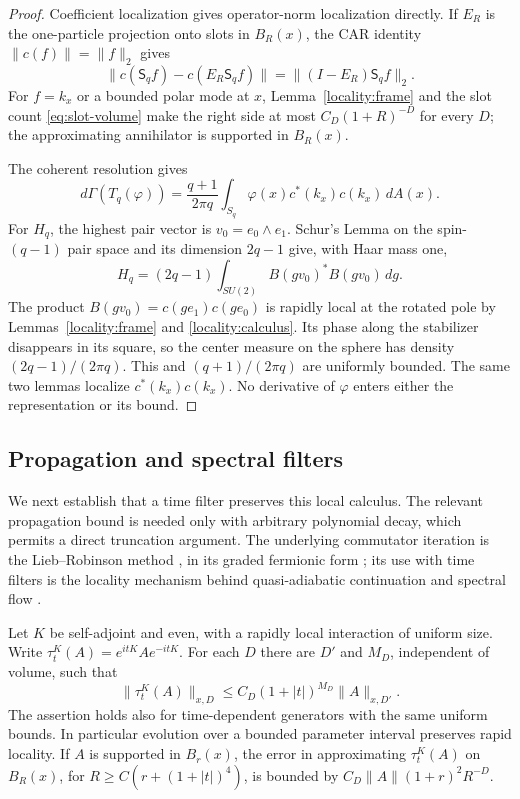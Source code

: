 \begin{proof}
Coefficient localization gives operator-norm localization directly.
If $E_R$ is the one-particle projection onto slots in $B_R(x)$, the
CAR identity $\|c(f)\|=\|f\|_2$ gives
\[
 \|c(\mathsf S_q f)-c(E_R\mathsf S_q f)\|
       =\|(I-E_R)\mathsf S_q f\|_2.
\]
For $f=k_x$ or a bounded polar mode at $x$,
Lemma~\ref{locality:frame} and the slot count
\eqref{eq:slot-volume} make the right side at most
$C_D(1+R)^{-D}$ for every $D$; the approximating annihilator is
supported in $B_R(x)$.

The coherent resolution gives
\[
 d\Gamma(T_q(\varphi))=\frac{q+1}{2\pi q}
       \int_{S_q}\varphi(x)c^*(k_x)c(k_x)\,dA(x).
\]
For $H_q$, the highest pair vector is $v_0=e_0\wedge e_1$.
Schur's Lemma on the spin-$(q-1)$ pair space and its dimension
$2q-1$ give, with Haar mass one,
\begin{equation}
 H_q=(2q-1)\int_{SU(2)}B(gv_0)^*B(gv_0)\,dg.
 \label{eq:coherent-pair-resolution}
\end{equation}
The product $B(gv_0)=c(ge_1)c(ge_0)$ is rapidly local at the
rotated pole by Lemmas~\ref{locality:frame} and
\ref{locality:calculus}.  Its phase along the stabilizer disappears
in its square, so the center measure on the sphere has density
$(2q-1)/(2\pi q)$.  This and $(q+1)/(2\pi q)$ are uniformly bounded.
The same two lemmas localize $c^*(k_x)c(k_x)$.  No derivative of
$\varphi$ enters either the representation or its bound.
\end{proof}

\subsection{Propagation and spectral filters}

We next establish that a time filter preserves this local calculus.
The relevant propagation bound is needed only with arbitrary polynomial
decay, which permits a direct truncation argument.  The underlying
commutator iteration is the Lieb--Robinson method
\cite{LR}, in its graded fermionic form \cite{NSY}; its use with time filters is the locality
mechanism behind quasi-adiabatic continuation and spectral flow
\cite{HW,BMNS}.

\begin{lemma}\label{locality:dynamics}
Let $K$ be self-adjoint and even, with a rapidly local interaction of
uniform size.  Write $\tau_t^K(A)=e^{itK}Ae^{-itK}$.  For each $D$
there are $D'$ and $M_D$, independent of volume, such that
\begin{equation}
 \|\tau_t^K(A)\|_{x,D}
       \leq C_D(1+|t|)^{M_D}\|A\|_{x,D'}.
 \label{eq:polynomial-propagation}
\end{equation}
The assertion holds also for time-dependent generators with the same
uniform bounds.  In particular evolution over a bounded parameter
interval preserves rapid locality.  If $A$ is supported in $B_r(x)$,
the error in approximating $\tau_t^K(A)$ on $B_R(x)$, for
$R\geq C(r+(1+|t|)^4)$, is bounded by
$C_D\|A\|(1+r)^2R^{-D}$.
\end{lemma}

